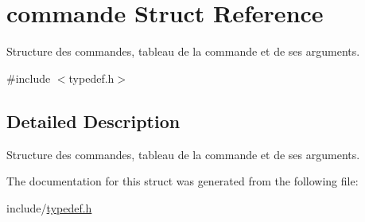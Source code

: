 \hypertarget{structcommande}{}\section{commande Struct Reference}
\label{structcommande}


Structure des commandes, tableau de la commande et de ses arguments.  




{\ttfamily \#include $<$typedef.\+h$>$}



\subsection{Detailed Description}
Structure des commandes, tableau de la commande et de ses arguments. 

The documentation for this struct was generated from the following file\+:\begin{DoxyCompactItemize}
\item 
include/\hyperlink{typedef_8h}{typedef.\+h}\end{DoxyCompactItemize}
